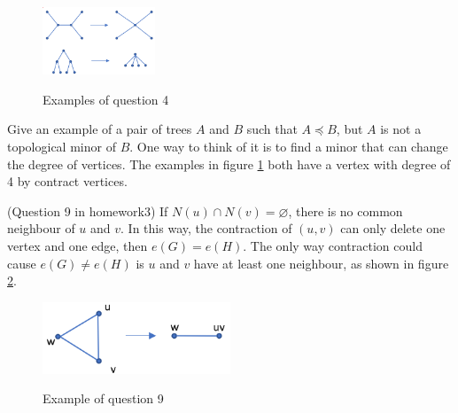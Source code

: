 \documentclass{article}
\begin{document}
  \begin{question}
  \begin{figure}[!h]
      \centering
      {\includegraphics[width=0.30\textwidth]{figure/problem4.png}}
      \caption{Examples of question 4}
      \label{prob4}
    \end{figure}
  
  Give an example of a pair of trees \(A\) and \(B\) such that \(A \preceq B\), but
\(A\) is not a topological minor of \(B\). One way to think of it is to find a minor that can change the degree of vertices. The examples in figure \ref{prob4} both have a vertex with degree of 4 by contract vertices.
  \end{question}
    
  \begin{question}
    (Question 9 in homework3)
    If \(N(u)\cap N(v) = \varnothing \), there is no common neighbour of \(u\) and \(v\). In this way, the contraction of \((u,v)\) can only delete one vertex and one edge, then \(e(G) = e(H)\). The only way contraction could cause \(e(G) \neq e(H)\) is \(u\) and \(v\) have at least one neighbour, as shown in figure \ref{prob9}.
    \begin{figure}[!h]
      \centering
      {\includegraphics[width=0.5\textwidth]{figure/problem9.png}}
      \caption{Example of question 9}
      \label{prob9}
    \end{figure}

  \end{question}
\end{document}
